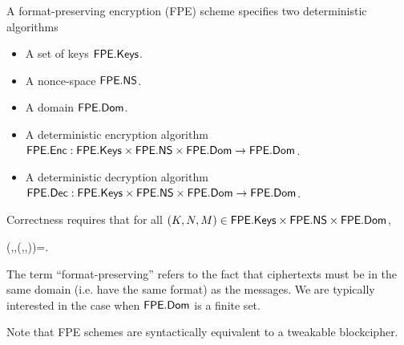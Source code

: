 
A format-preserving encryption (FPE) scheme specifies two deterministic algorithms
\begin{itemize}
	\item A set of keys $\mathsf{FPE}.\mathsf{Keys}$.
	\item A nonce-space $\mathsf{FPE}.\mathsf{NS}$.
	\item A domain $\mathsf{FPE}.\mathsf{Dom}$.
	\item A deterministic encryption algorithm $\mathsf{FPE}.\mathsf{Enc}:\mathsf{FPE}.\mathsf{Keys}\times\mathsf{FPE}.\mathsf{NS}\times\mathsf{FPE}.\mathsf{Dom}\to\mathsf{FPE}.\mathsf{Dom}$.
	\item A deterministic decryption algorithm $\mathsf{FPE}.\mathsf{Dec}:\mathsf{FPE}.\mathsf{Keys}\times\mathsf{FPE}.\mathsf{NS}\times\mathsf{FPE}.\mathsf{Dom}\to\mathsf{FPE}.\mathsf{Dom}$.
\end{itemize}
Correctness requires that for all $(K,N,M)\in\mathsf{FPE}.\mathsf{Keys}\times\mathsf{FPE}.\mathsf{NS}\times\mathsf{FPE}.\mathsf{Dom}$,
\begin{newmath}
	\Dec{\FPE}(\key,\nonce,\Enc{\FPE}(\key,\nonce,\msg))=\msg.
\end{newmath}

The term ``format-preserving'' refers to the fact that ciphertexts must be in the same domain (i.e. have the same format) as the messages. We are typically interested in the case when $\mathsf{FPE}.\mathsf{Dom}$ is a finite set.

Note that FPE schemes are syntactically equivalent to a tweakable blockcipher. 